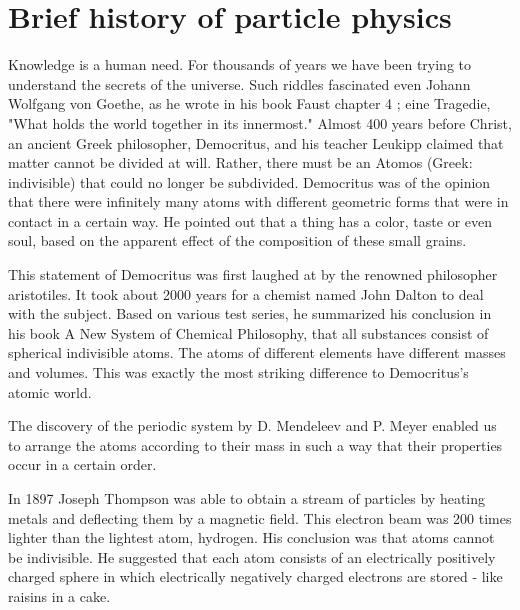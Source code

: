 \section{Brief history of particle physics}
Knowledge is a human need. For thousands of years we have been trying to understand the secrets of the universe. Such riddles fascinated even Johann Wolfgang von Goethe, as he wrote in his book Faust chapter 4 \cite{goethe1921faust} ; eine Tragedie, "What holds the world together in its innermost." 
Almost 400 years before Christ, an ancient Greek philosopher, Democritus, and his teacher Leukipp claimed that matter cannot be divided at will. Rather, there must be an Atomos (Greek: indivisible) that could no longer be subdivided.
Democritus was of the opinion that there were infinitely many atoms with different geometric forms that were in contact in a certain way. He pointed out that a thing has a color, taste or even soul, based on the apparent effect of the composition of these small grains.
\cite{capelle1968vorsokratiker}

This statement of Democritus was first laughed at by the renowned philosopher aristotiles. It took about 2000 years for a chemist named John Dalton to deal with the subject. Based on various test series, he summarized his conclusion in his book A New System of Chemical Philosophy, that all substances consist of spherical indivisible atoms. The atoms of different elements have different masses and volumes. This was exactly the most striking difference to Democritus's atomic world.\cite{dalton2010new}

The discovery of the periodic system by D. Mendeleev and P. Meyer enabled us to arrange the atoms according to their mass in such a way that their properties occur in a certain order.\cite{haken2013atom}

In 1897 Joseph Thompson was able to obtain a stream of particles by heating metals and deflecting them by a magnetic field. This electron beam was 200 times lighter than the lightest atom, hydrogen.
His conclusion was that atoms cannot be indivisible. He suggested that each atom consists of an electrically positively charged sphere in which electrically negatively charged electrons are stored - like raisins in a cake.

